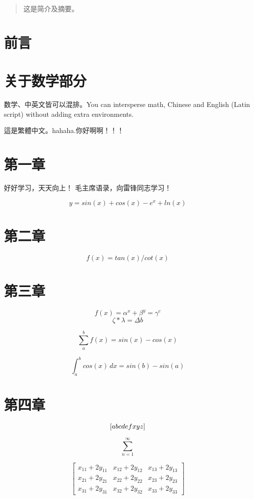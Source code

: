 \documentclass{ctexart}
\begin{document}
\tableofcontents

\begin{abstract}
这是简介及摘要。
\end{abstract}

\section{前言}

\section{关于数学部分}
数学、中英文皆可以混排。You can intersperse math, Chinese and English (Latin script) without adding extra environments.

這是繁體中文。hahaha.你好啊啊！！！

\section*{第一章}

好好学习，天天向上！
毛主席语录，向雷锋同志学习！

\[y=sin(x)+cos(x)-e^x+ln(x)\]

\section*{第二章}

\[f(x)=tan(x)/cot(x)\]

\section*{第三章}

$$f(x)=\alpha^x+\beta^y=\gamma^c$$
\[\zeta * \lambda = \Delta b\]

\[\sum_{a}^{b}f(x)=sin(x)-cos(x) \]

\[\int_{a}^{b}cos(x)\,dx=sin(b)-sin(a) \]

\section*{第四章}

\[\left[ a b c \\ d e f \\ x y z \right] \]

\[\sum_{n = 1}^{\infty}  \]


$$ \left[\begin{array}{lll}x_{11}+2 y_{11} & x_{12}+2 y_{12} & x_{13}+2 y_{13} \\ x_{21}+2 y_{21} & x_{22}+2 y_{22} & x_{23}+2 y_{23} \\ x_{31}+2 y_{31} & x_{32}+2 y_{32} & x_{33}+2 y_{33}\end{array}\right] $$  
\end{document}
